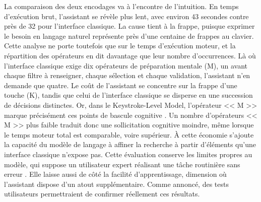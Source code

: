 \documentclass[12pt]{article}
\begin{document}
La comparaison des deux encodages va à l'encontre de l'intuition. En temps d'exécution brut, l'assistant se révèle plus lent, avec environ 43 secondes contre près de 32 pour l'interface classique. La cause tient à la frappe, puisque exprimer le besoin en langage naturel représente près d'une centaine de frappes au clavier.
\newline\newline
Cette analyse ne porte toutefois que sur le temps d'exécution moteur, et la répartition des opérateurs en dit davantage que leur nombre d'occurrences. Là où l'interface classique exige dix opérateurs de préparation mentale (M), un avant chaque filtre à renseigner, chaque sélection et chaque validation, l'assistant n'en demande que quatre. Le coût de l'assistant se concentre sur la frappe d'une touche (K), tandis que celui de l'interface classique se disperse en une succession de décisions distinctes. Or, dans le Keystroke-Level Model, l'opérateur << M >> marque précisément ces points de bascule cognitive \parencite[p~399]{card_keystroke-level_1980}. Un nombre d'opérateurs << M >> plus faible traduit donc une sollicitation cognitive moindre, même lorsque le temps moteur total est comparable, voire supérieur. À cette économie s'ajoute la capacité du modèle de langage à affiner la recherche à partir d'éléments qu'une interface classique n'expose pas.
\newline\newline
Cette évaluation conserve les limites propres au modèle, qui suppose un utilisateur expert réalisant une tâche routinière sans erreur \parencite[p~409]{card_keystroke-level_1980}. Elle laisse aussi de côté la facilité d'apprentissage, dimension où l'assistant dispose d'un atout supplémentaire. Comme annoncé, des tests utilisateurs permettraient de confirmer réellement ces résultats.
\end{document}
